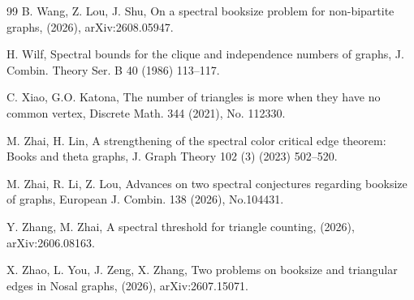 \documentclass[11pt,a4paper]{article}
\theoremstyle{definition}
\theoremstyle{plain}
\begin{document}
\begin{thebibliography}{99}
B. Wang, Z. Lou, J. Shu, 
On a spectral booksize problem for non-bipartite graphs, 
(2026), arXiv:2608.05947. 

H. Wilf, 
Spectral bounds for the clique and independence numbers of graphs, 
J. Combin. Theory Ser. B 40 (1986) 113--117.   

C. Xiao, G.O. Katona, 
 The number of triangles is more when they have no 
 common vertex, Discrete Math. 344 (2021), No. 112330. 

M. Zhai, H. Lin,
A strengthening of the spectral color critical edge
theorem: Books and theta graphs,
J. Graph Theory 102 (3) (2023) 502--520. 

M. Zhai, R. Li, Z. Lou, 
Advances on two spectral conjectures regarding booksize of graphs, European J. Combin. 138 (2026), No.104431. 

Y. Zhang, M. Zhai, 
A spectral threshold for triangle counting, 
(2026), arXiv:2606.08163. 

X. Zhao, L. You, J. Zeng, X. Zhang,
Two problems on booksize and triangular edges in Nosal graphs, (2026), 
arXiv:2607.15071.

\end{thebibliography}
\end{document}
